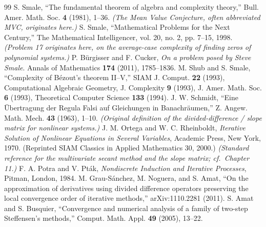 \documentclass[11pt,a4paper]{article}
\begin{document}
\begin{thebibliography}{99}
 S. Smale, ``The fundamental theorem of algebra and complexity theory,'' Bull. Amer. Math. Soc. \textbf{4} (1981), 1--36. \emph{(The Mean Value Conjecture, often abbreviated MVC, originates here.)}
 S. Smale, ``Mathematical Problems for the Next Century,'' The Mathematical Intelligencer, vol. 20, no. 2, pp. 7--15, 1998. \emph{(Problem 17 originates here, on the average-case complexity of finding zeros of polynomial systems.)}
 P. B\"urgisser and F. Cucker, \textit{On a problem posed by Steve Smale}. Annals of Mathematics \textbf{174} (2011), 1785--1836.
 M. Shub and S. Smale, ``Complexity of B\'ezout's theorem II--V,'' SIAM J. Comput. \textbf{22} (1993), Computational Algebraic Geometry, J. Complexity \textbf{9} (1993), J. Amer. Math. Soc. \textbf{6} (1993), Theoretical Computer Science \textbf{133} (1994).
 J. W. Schmidt, ``Eine \"Ubertragung der Regula Falsi auf Gleichungen in Banachr\"aumen,'' Z. Angew. Math. Mech. \textbf{43} (1963), 1--10. \emph{(Original definition of the divided-difference / slope matrix for nonlinear systems.)}
 J. M. Ortega and W. C. Rheinboldt, \textit{Iterative Solution of Nonlinear Equations in Several Variables}, Academic Press, New York, 1970. (Reprinted SIAM Classics in Applied Mathematics 30, 2000.) \emph{(Standard reference for the multivariate secant method and the slope matrix; cf.\ Chapter 11.)}
 F. A. Potra and V. Pt\'ak, \textit{Nondiscrete Induction and Iterative Processes}, Pitman, London, 1984.
 M. Grau-S\'anchez, M. Noguera, and S. Amat, ``On the approximation of derivatives using divided difference operators preserving the local convergence order of iterative methods,'' arXiv:1110.2281 (2011).
 S. Amat and S. Busquier, ``Convergence and numerical analysis of a family of two-step Steffensen's methods,'' Comput. Math. Appl. \textbf{49} (2005), 13--22.
\end{thebibliography}
\end{document}
